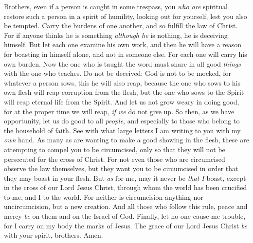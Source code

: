 \begin{biblechapter} %
 Brothers, even if a person is caught in some trespass, you \textit{who are} spiritual restore such a person in a spirit of humility, looking out for yourself, lest you also be tempted.
\verse Carry the burdens of one another, and so fulfill the law of Christ.
\verse For if anyone thinks he is something \textit{although he} is nothing, he is deceiving himself.
\verse But let each one examine his own work, and then he will have a reason for boasting in himself alone, and not in someone else.
\verse For each one will carry his own burden.
 Now the one who is taught the word must share in all good \textit{things} with the one who teaches.
\verse Do not be deceived: God is not to be mocked, for whatever a person sows, this he will also reap,
\verse because the one who sows to his own flesh will reap corruption from the flesh, but the one who sows to the Spirit will reap eternal life from the Spirit.
\verse And let us not grow weary in doing good, for at the proper time we will reap, \textit{if we} do not give up.
\verse So then, as we have opportunity, let us do good to all \textit{people}, and especially to those who belong to the household of faith.
 See with what large letters I am writing to you with my \textit{own} hand.
\verse As many as are wanting to make a good showing in the flesh, these are attempting to compel you to be circumcised, only so that they will not be persecuted for the cross of Christ.
\verse For not even those who are circumcised observe the law themselves, but they want you to be circumcised in order that they may boast in your flesh.
\verse But \textit{as} for me, may it never be \textit{that I} boast, except in the cross of our Lord Jesus Christ, through whom the world has been crucified to me, and I to the world.
\verse For neither is circumcision anything nor uncircumcision, but a new creation.
\verse And all those who follow this rule, peace and mercy \textit{be} on them and on the Israel of God.
 Finally, let no one cause me trouble, for I carry on my body the marks of Jesus.
\verse The grace of our Lord Jesus Christ \textit{be} with your spirit, brothers. Amen.
\end{biblechapter}

